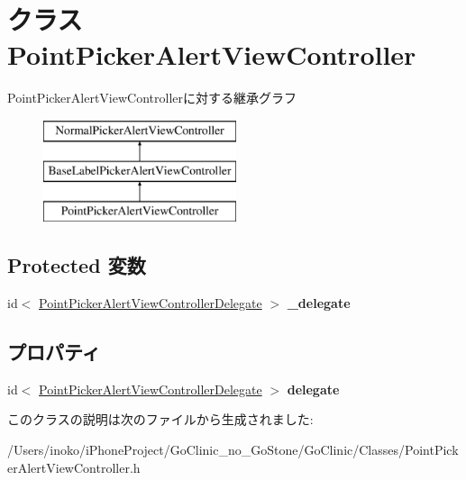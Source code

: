 \hypertarget{interface_point_picker_alert_view_controller}{
\section{クラス PointPickerAlertViewController}
\label{interface_point_picker_alert_view_controller}
}
PointPickerAlertViewControllerに対する継承グラフ\begin{figure}[H]
\begin{center}
\leavevmode
\includegraphics[height=3.000000cm]{interface_point_picker_alert_view_controller}
\end{center}
\end{figure}
\subsection*{Protected 変数}
\begin{DoxyCompactItemize}
\item 
\hypertarget{interface_point_picker_alert_view_controller_acde7df8cdadcee9df04da93af06fd0da}{
id$<$ \hyperlink{protocol_point_picker_alert_view_controller_delegate-p}{PointPickerAlertViewControllerDelegate} $>$ {\bfseries \_\-delegate}}
\label{interface_point_picker_alert_view_controller_acde7df8cdadcee9df04da93af06fd0da}

\end{DoxyCompactItemize}
\subsection*{プロパティ}
\begin{DoxyCompactItemize}
\item 
\hypertarget{interface_point_picker_alert_view_controller_a50e6a7d973d361bc3c0acbb2d54a529b}{
id$<$ \hyperlink{protocol_point_picker_alert_view_controller_delegate-p}{PointPickerAlertViewControllerDelegate} $>$ {\bfseries delegate}}
\label{interface_point_picker_alert_view_controller_a50e6a7d973d361bc3c0acbb2d54a529b}

\end{DoxyCompactItemize}


このクラスの説明は次のファイルから生成されました:\begin{DoxyCompactItemize}
\item 
/Users/inoko/iPhoneProject/GoClinic\_\-no\_\-GoStone/GoClinic/Classes/PointPickerAlertViewController.h\end{DoxyCompactItemize}
